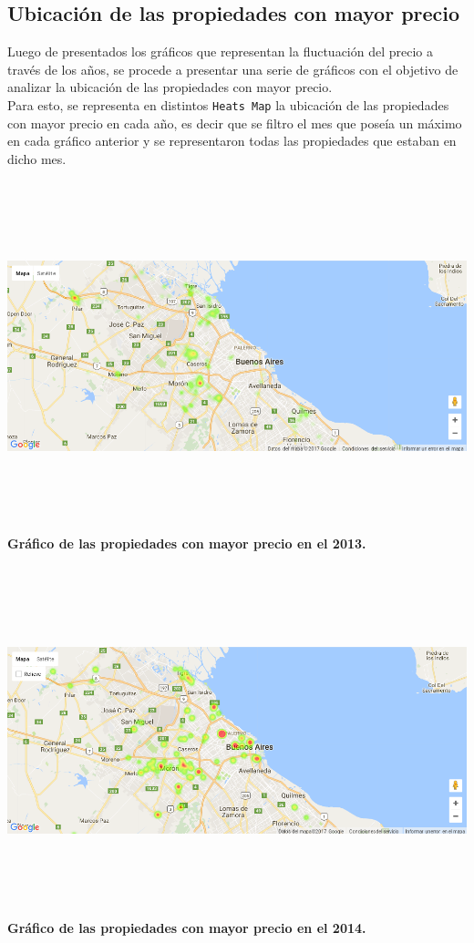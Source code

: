 \documentclass[a4paper, 10pt]{article}
\def\code#1{\texttt{#1}}
\newcommand\tab[1][0.5cm]{\hspace*{#1}}
\begin{document}
	      \subsection{Ubicación de las propiedades con mayor precio}
    			Luego de presentados los gráficos que representan la fluctuación del precio a través de los años, se procede a presentar
    			una serie de gráficos con el objetivo de analizar la ubicación de las propiedades con mayor precio. \\
 			\tab Para esto, se representa en distintos \code{Heats Map} la ubicación de las propiedades con mayor precio en cada año,
 			es decir que se filtro el mes que poseía un máximo en cada gráfico anterior y se representaron todas las propiedades que
 			estaban en dicho mes.
	        \begin{center}
    	         	\includegraphics[width=7in, height=4in]{images/ubicP2013}
            		\textbf{Gráfico de las propiedades con mayor precio en el 2013.}
        		\end{center}
        		\begin{center}
              	\includegraphics[width=7in, height=4in]{images/ubicP2014}
             	\textbf{Gráfico de las propiedades con mayor precio en el 2014.}
        		\end{center}
\end{document}
